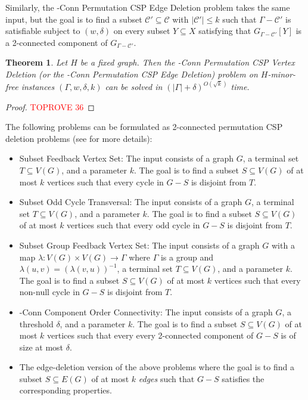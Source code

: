 \documentclass[a4paper,11pt]{article}
\numberwithin{lemma}{section}
\newtheorem{theorem}[lemma]{Theorem}
\begin{document}
Similarly, the {-Conn Permutation CSP Edge Deletion} problem takes the same input, but the goal is to find a subset $\mathcal{C}' \subseteq \mathcal{C}$ with $|\mathcal{C}'| \leq k$ such that $\varGamma - \mathcal{C}'$ is satisfiable subject to $(w,\delta)$ on every subset $Y \subseteq X$ satisfying that $G_{\varGamma - \mathcal{C}'}[Y]$ is a 2-connected component of $G_{\varGamma - \mathcal{C}'}$.

\begin{theorem}\label{thm-2conn}
 Let $H$ be a fixed graph.
 Then the {-Conn Permutation CSP Vertex Deletion} (or the {-Conn Permutation CSP Edge Deletion}) problem on $H$-minor-free instances $(\varGamma,w,\delta,k)$ can be solved in $(|\varGamma|+\delta)^{O(\sqrt{k})}$ time.
\end{theorem}

\begin{proof}\textcolor{red}{TOPROVE 36}\end{proof}

The following problems can be formulated as 2-connected permutation CSP deletion problems (see \cite{MarxMNT22} for more details):
\begin{itemize}
 \item {\sc Subset Feedback Vertex Set}: The input consists of a graph $G$, a terminal set $T \subseteq V(G)$, and a parameter $k$.
 The goal is to find a subset $S \subseteq V(G)$ of at most $k$ vertices such that every cycle in $G - S$ is disjoint from $T$.
 \item {\sc Subset Odd Cycle Transversal}: The input consists of a graph $G$, a terminal set $T \subseteq V(G)$, and a parameter $k$. The goal is to find a subset $S \subseteq V(G)$ of at most $k$ vertices such that every odd cycle in $G - S$ is disjoint from $T$.
 \item {\sc Subset Group Feedback Vertex Set}: The input consists of a graph $G$ with a map $\lambda\colon V(G) \times V(G) \rightarrow \varGamma$ where $\varGamma$ is a group and $\lambda(u,v) = (\lambda(v,u))^{-1}$, a terminal set $T \subseteq V(G)$, and a parameter $k$. The goal is to find a subset $S \subseteq V(G)$ of at most $k$ vertices such that every non-null cycle in $G - S$ is disjoint from $T$.
 \item {-Conn Component Order Connectivity}:  The input consists of a graph $G$, a threshold $\delta$, and a parameter $k$. The goal is to find a subset $S \subseteq V(G)$ of at most $k$ vertices such that every every 2-connected component of $G-S$ is of size at most $\delta$.
 \item The edge-deletion version of the above problems where the goal is to find a subset $S \subseteq E(G)$ of at most $k$ \emph{edges} such that $G-S$ satisfies the corresponding properties.
\end{itemize}
\end{document}
